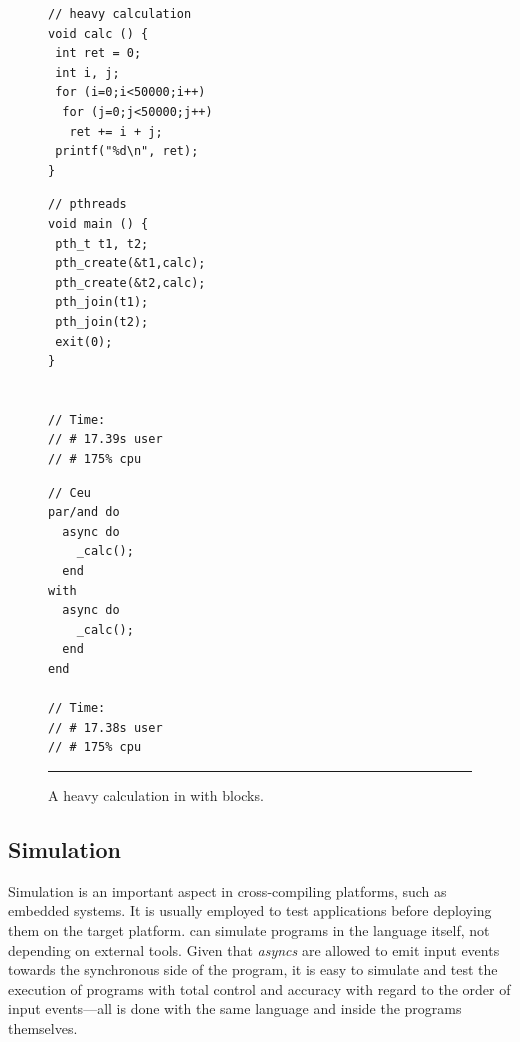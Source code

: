 \begin{figure}[t]
\begin{minipage}[t]{0.37\linewidth}
\begin{lstlisting}
// heavy calculation
void calc () {
 int ret = 0;
 int i, j;
 for (i=0;i<50000;i++)
  for (j=0;j<50000;j++)
   ret += i + j;
 printf("%d\n", ret);
}
\end{lstlisting}
\end{minipage}
%
\begin{minipage}[t]{0.35\linewidth}
\begin{lstlisting}
// pthreads
void main () {
 pth_t t1, t2;
 pth_create(&t1,calc);
 pth_create(&t2,calc);
 pth_join(t1);
 pth_join(t2);
 exit(0);
}


// Time:
// # 17.39s user
// # 175% cpu
\end{lstlisting}
\end{minipage}
%
\begin{minipage}[t]{0.26\linewidth}
\begin{lstlisting}
// Ceu
par/and do
  async do
    _calc();
  end
with
  async do
    _calc();
  end
end

// Time:
// # 17.38s user
// # 175% cpu
\end{lstlisting}
\end{minipage}
\rule{14cm}{0.37pt}
\caption{ A heavy calculation in \CEU with  blocks.
{\small %
}%
\label{lst.async.2}
}
\end{figure}

\subsection{Simulation}
\label{sec:ceu:simul}

Simulation is an important aspect in cross-compiling platforms, such as 
embedded systems.
It is usually employed to test applications before deploying them on the target 
platform.
%
\CEU can simulate programs in the language itself, not depending on external 
tools.
Given that \emph{asyncs} are allowed to emit input events towards the 
synchronous side of the program, it is easy to simulate and test the execution 
of programs with total control and accuracy with regard to the order of input 
events---all is done with the same language and inside the programs themselves.

